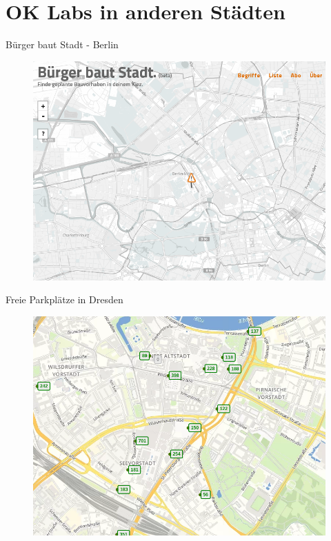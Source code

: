 \section{OK Labs in anderen Städten}

\begin{frame}[t]{Bürger baut Stadt - Berlin}
\begin{figure}[h]
 \centering
 \includegraphics[scale=0.3]{section_other_ok_labs_constructions.png}
\end{figure}
\end{frame}

\begin{frame}[t]{Freie Parkplätze in Dresden}
\begin{figure}[h]
 \centering
 \includegraphics[scale=0.3]{section_other_ok_labs_parking.png}
\end{figure}
\end{frame}

